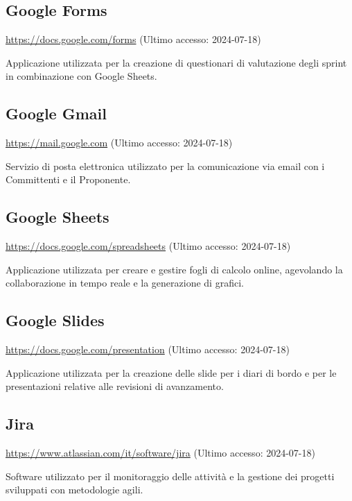 \subsection{Google Forms}
\par \href{https://docs.google.com/forms}{https://docs.google.com/forms} (Ultimo accesso: 2024-07-18)
\par Applicazione utilizzata per la creazione di questionari di valutazione degli sprint in combinazione con Google Sheets.

\subsection{Google Gmail}
\par \href{https://mail.google.com}{https://mail.google.com} (Ultimo accesso: 2024-07-18)
\par Servizio di posta elettronica utilizzato per la comunicazione via email con i Committenti e il Proponente.

\subsection{Google Sheets}
\par \href{https://docs.google.com/spreadsheets}{https://docs.google.com/spreadsheets} (Ultimo accesso: 2024-07-18)
\par Applicazione utilizzata per creare e gestire fogli di calcolo online, agevolando la collaborazione in tempo reale e la generazione di grafici.

\subsection{Google Slides}
\par \href{https://docs.google.com/presentation}{https://docs.google.com/presentation} (Ultimo accesso: 2024-07-18)
\par Applicazione utilizzata per la creazione delle slide per i diari di bordo e per le presentazioni relative alle revisioni di avanzamento.
    
\subsection{Jira}
\par \href{https://www.atlassian.com/it/software/jira}{https://www.atlassian.com/it/software/jira} (Ultimo accesso: 2024-07-18)
\par Software utilizzato per il monitoraggio delle attività e la gestione dei progetti sviluppati con metodologie agili.
    
